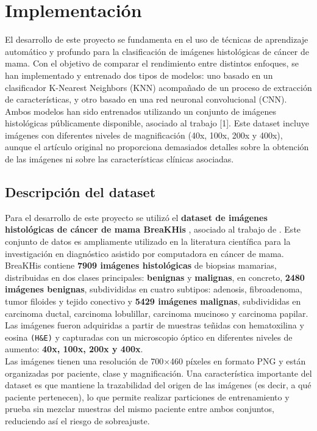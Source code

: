 \documentclass[12pt]{article} %
\begin{document}
\section{Implementación}
El desarrollo de este proyecto se fundamenta en el uso de técnicas de aprendizaje automático y profundo para la clasificación de imágenes histológicas de cáncer de mama. Con el objetivo de comparar el rendimiento entre distintos enfoques, se han implementado y entrenado dos tipos de modelos: uno basado en un clasificador K-Nearest Neighbors (KNN) acompañado de un proceso de extracción de características, y otro basado en una red neuronal convolucional (CNN). Ambos modelos han sido entrenados utilizando un conjunto de imágenes histológicas públicamente disponible, asociado al trabajo [1]. Este dataset incluye imágenes con diferentes niveles de magnificación (40x, 100x, 200x y 400x), aunque el artículo original no proporciona demasiados detalles sobre la obtención de las imágenes ni sobre las características clínicas asociadas.\\

\subsection{Descripción del dataset}
Para el desarrollo de este proyecto se utilizó el \textbf{dataset de imágenes histológicas de cáncer de mama BreaKHis} \cite{google_drive_folder}, asociado al trabajo de \cite{bardou2018classification}. Este conjunto de datos es ampliamente utilizado en la literatura científica para la investigación en diagnóstico asistido por computadora en cáncer de mama. BreaKHis contiene \textbf{7909 imágenes histológicas} de biopsias mamarias, distribuidas en dos clases principales: \textbf{benignas} y \textbf{malignas}, en concreto, \textbf{2480 imágenes benignas}, subdivididas en cuatro subtipos: adenosis, fibroadenoma, tumor filoides y tejido conectivo y  \textbf{5429 imágenes malignas}, subdivididas en carcinoma ductal, carcinoma lobulillar, carcinoma mucinoso y carcinoma papilar. Las imágenes fueron adquiridas a partir de muestras teñidas con hematoxilina y eosina \texttt{(H\&E)} y capturadas con un microscopio óptico en diferentes niveles de aumento: \textbf{40x, 100x, 200x y 400x}.\\

Las imágenes tienen una resolución de 700×460 píxeles en formato PNG y están organizadas por paciente, clase y magnificación. Una característica importante del dataset es que mantiene la trazabilidad del origen de las imágenes (es decir, a qué paciente pertenecen), lo que permite realizar particiones de entrenamiento y prueba sin mezclar muestras del mismo paciente entre ambos conjuntos, reduciendo así el riesgo de sobreajuste.
\end{document}
